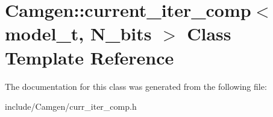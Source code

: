 \hypertarget{a00112}{\section{Camgen\-:\-:current\-\_\-iter\-\_\-comp$<$ model\-\_\-t, N\-\_\-bits $>$ Class Template Reference}
\label{a00112}
}


The documentation for this class was generated from the following file\-:\begin{DoxyCompactItemize}
\item 
include/\-Camgen/curr\-\_\-iter\-\_\-comp.\-h\end{DoxyCompactItemize}
